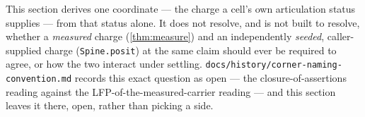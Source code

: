 \begin{theorem}\label{thm:measured-vs-seeded}\notready{}
This section derives one coordinate --- the charge a cell's own articulation
status supplies --- from that status alone. It does not resolve, and is not
built to resolve, whether a \emph{measured} charge (\cref{thm:measure}) and
an independently \emph{seeded}, caller-supplied charge (\texttt{Spine.posit})
at the same claim should ever be required to agree, or how the two interact
under settling. \texttt{docs/history/corner-naming-convention.md} records
this exact question as open --- the closure-of-assertions reading against
the LFP-of-the-measured-carrier reading --- and this section leaves it there,
open, rather than picking a side.
\end{theorem}
